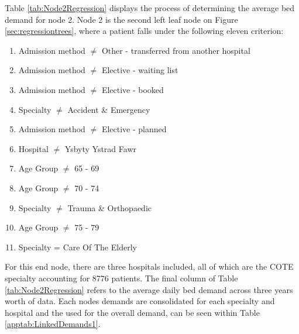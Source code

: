 \documentclass[../thesis.tex]{subfiles}
\begin{document}
Table \ref{tab:Node2Regression} displays the process of determining the average bed demand for node 2. Node 2 is the second left leaf node on Figure \ref{sec:regressiontrees}, where a patient falls under the following eleven criterion:
\begin{enumerate}
    \item Admission method $\neq$ Other - transferred from another hospital
    \item Admission method $\neq$ Elective - waiting list
    \item Admission method $\neq$ Elective - booked
    \item Specialty $\neq$ Accident \& Emergency
    \item Admission method $\neq$ Elective - planned
    \item Hospital $\neq$ Ysbyty Ystrad Fawr
    \item Age Group $\neq$ 65 - 69
    \item Age Group $\neq$ 70 - 74
    \item Specialty $\neq$ Trauma \& Orthopaedic
    \item Age Group $\neq$ 75 - 79
    \item Specialty = Care Of The Elderly
\end{enumerate}

For this end node, there are three hospitals included, all of which are the COTE specialty accounting for 8776 patients. The final column of Table \ref{tab:Node2Regression} refers to the average daily bed demand across three years worth of data. Each nodes demands are consolidated for each specialty and hospital and the used for the overall demand, can be seen within Table \ref{apptab:LinkedDemands1}.
\begin{table}[h!]
    \centering{}
    \caption{Regression Tree Node 2}
    \label{tab:Node2Regression}
\end{table}
\end{document}
